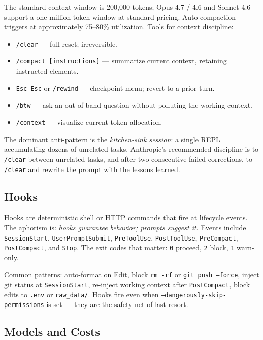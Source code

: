 \documentclass[11pt]{article}
\begin{document}
The standard context window is 200{,}000 tokens; Opus 4.7 / 4.6 and Sonnet 4.6 support a one-million-token window at standard pricing. Auto-compaction triggers at approximately 75--80\% utilization. Tools for context discipline:

\begin{itemize}[leftmargin=*,nosep]
    \item \texttt{/clear} --- full reset; irreversible.
    \item \texttt{/compact [instructions]} --- summarize current context, retaining instructed elements.
    \item \texttt{Esc Esc} or \texttt{/rewind} --- checkpoint menu; revert to a prior turn.
    \item \texttt{/btw} --- ask an out-of-band question without polluting the working context.
    \item \texttt{/context} --- visualize current token allocation.
\end{itemize}

The dominant anti-pattern is the \emph{kitchen-sink session}: a single REPL accumulating dozens of unrelated tasks. Anthropic's recommended discipline is to \texttt{/clear} between unrelated tasks, and after two consecutive failed corrections, to \texttt{/clear} and rewrite the prompt with the lessons learned.

\subsection{Hooks}\label{sec:hooks}

Hooks are deterministic shell or HTTP commands that fire at lifecycle events. The aphorism is: \emph{hooks guarantee behavior; prompts suggest it}. Events include \texttt{SessionStart}, \texttt{UserPromptSubmit}, \texttt{PreToolUse}, \texttt{PostToolUse}, \texttt{PreCompact}, \texttt{PostCompact}, and \texttt{Stop}. The exit codes that matter: \texttt{0} proceed, \texttt{2} block, \texttt{1} warn-only.

Common patterns: auto-format on Edit, block \texttt{rm -rf} or \texttt{git push --force}, inject git status at \texttt{SessionStart}, re-inject working context after \texttt{PostCompact}, block edits to \texttt{.env} or \texttt{raw\_data/}. Hooks fire even when \texttt{--dangerously-skip-permissions} is set --- they are the safety net of last resort.

\subsection{Models and Costs}
\end{document}
